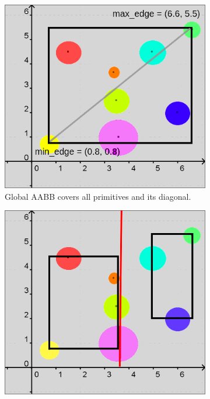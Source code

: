 \documentclass[11pt,a4paper]{article}
\begin{document}
\begin{figure}[h]	
     \centering
     \begin{subfigure}[t]{0.3\textwidth}
         \centering
         \includegraphics[width=\textwidth]{images/example_bvh/2_g.png}
         \captionsetup{justification=centering,margin=0.1cm}
         \caption{Global AABB covers all primitives and its diagonal.
}
         \label{fig:pi_4000}
     \end{subfigure}
     \hfill
     \begin{subfigure}[t]{0.3\textwidth}
         \centering
         \includegraphics[width=\textwidth]{images/example_bvh/3_g.png}

\end{subfigure}
\end{figure}
\end{document}
